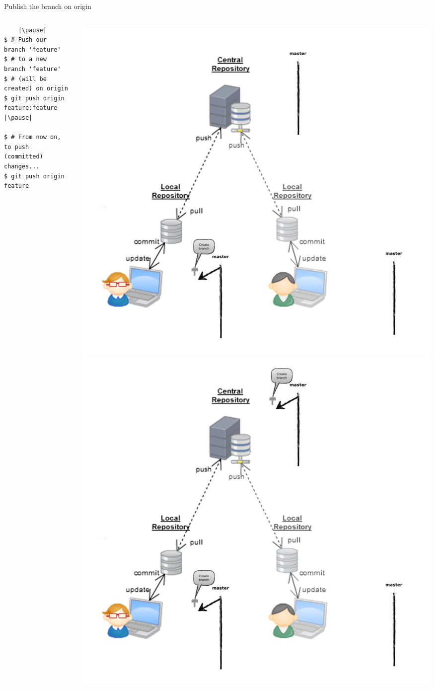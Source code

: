 \begin{frame}[fragile]{Publish the branch on origin}
\begin{columns}
	\begin{column}{0.4\textwidth}
	\begin{lstlisting}
	|\pause|
$ # Push our branch 'feature' 
$ # to a new branch 'feature' 
$ # (will be created) on origin
$ git push origin feature:feature |\pause|

$ # From now on, to push (committed) changes...
$ git push origin feature
	\end{lstlisting}
	\end{column}
	\begin{column}{0.6\textwidth}
		\begin{center}
			 {
				\includegraphics[width=.9\textwidth]{multiuser_local_branch.png}
			}\only<2> {
				\includegraphics[width=.9\textwidth]{multiuser_remote_branch.png}
}
\end{center}
\end{column}
\end{columns}
\end{frame}
